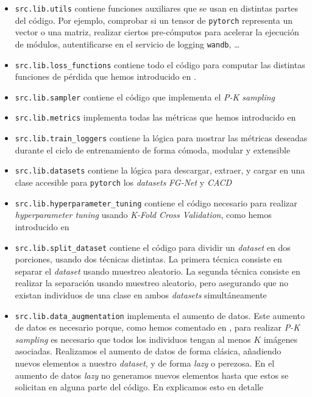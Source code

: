 \begin{itemize}
    \item \lstinline{src.lib.utils} contiene funciones auxiliares que se usan en distintas partes del código. Por ejemplo, comprobar si un tensor de \lstinline{pytorch} representa un vector o una matriz, realizar ciertos pre-cómputos para acelerar la ejecución de módulos, autentificarse en el servicio de logging \lstinline{wandb}, \ldots
    \item \lstinline{src.lib.loss_functions} contiene todo el código para computar las distintas funciones de pérdida que hemos introducido en .
    \item \lstinline{src.lib.sampler} contiene el código que implementa el \textit{P-K sampling}
    \item \lstinline{src.lib.metrics} implementa todas las métricas que hemos introducido en 
    \item \lstinline{src.lib.train_loggers} contiene la lógica para mostrar las métricas deseadas durante el ciclo de entrenamiento de forma cómoda, modular y extensible
    \item \lstinline{src.lib.datasets} contiene la lógica para descargar, extraer, y cargar en una clase accesible para \lstinline{pytorch} los \textit{datasets} \textit{FG-Net} y \textit{CACD}
    \item \lstinline{src.lib.hyperparameter_tuning} contiene el código necesario para realizar \textit{hyperparameter tuning} usando \textit{K-Fold Cross Validation}, como hemos introducido en 
    \item \lstinline{src.lib.split_dataset} contiene el código para dividir un \textit{dataset} en dos porciones, usando dos técnicas distintas. La primera técnica consiste en separar el \textit{dataset} usando muestreo aleatorio. La segunda técnica consiste en realizar la separación usando muestreo aleatorio, pero asegurando que no existan individuos de una clase en ambos \textit{datasets} simultáneamente
    \item \lstinline{src.lib.data_augmentation} implementa el aumento de datos. Este aumento de datos es necesario porque, como hemos comentado en , para realizar \textit{P-K sampling} es necesario que todos los individuos tengan al menos $K$ imágenes asociadas. Realizamos el aumento de datos de forma clásica, añadiendo nuevos elementos a nuestro \textit{dataset}, y de forma \textit{lazy} o perezosa. En el aumento de datos \textit{lazy} no generamos nuevos elementos hasta que estos se solicitan en alguna parte del código. En  explicamos esto en detalle
\end{itemize}

